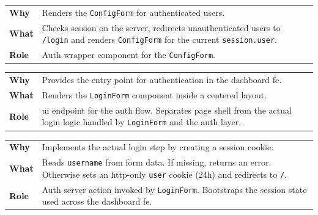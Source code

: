 \documentclass[11pt, a4paper, oneside, listof=totoc]{scrartcl}
\makeatletter
\newcommand{\codesummary}[3]{%
    \vspace{0.4\baselineskip}%
    \noindent\begin{tabularx}{\linewidth}{@{}>{\bfseries}l X@{}}
    Why  & #1\\
    What & #2\\
    Role & #3\\
    \end{tabularx}%
    \vspace{0.2\baselineskip}%
}
\makeatother
\begin{document}
        \clearpage

                \codesummary
                    {Renders the \texttt{ConfigForm} for authenticated users.}
                    {Checks session on the server, redirects unauthenticated users to \texttt{/login} and renders \texttt{ConfigForm} for the current \texttt{session.user}.}
                    {Auth wrapper component for the \texttt{ConfigForm}.}

                \codesummary
                    {Provides the entry point for authentication in the dashboard \gls{fe}.}
                    {Renders the \texttt{LoginForm} component inside a centered layout.}
                    {\gls{ui} endpoint for the auth flow. Separates page shell from the actual login logic handled by \texttt{LoginForm} and the auth layer.}

                \codesummary
                    {Implements the actual login step by creating a session cookie.}
                    {Reads \texttt{username} from form data. If missing, returns an error. Otherwise sets an \gls{http}-only \texttt{user} cookie (24h) and redirects to \texttt{/}.}
                    {Auth server action invoked by \texttt{LoginForm}. Bootstraps the session state used across the dashboard \gls{fe}.}
\end{document}
